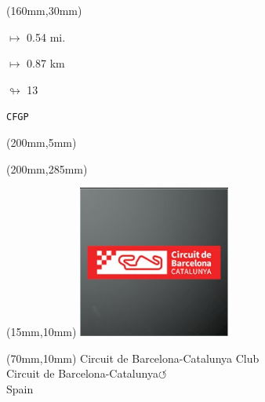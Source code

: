 \begin{textblock*}{40mm}(160mm,30mm)%
\Large
\par$\mapsto$ 0.54 mi.
\par$\mapsto$ 0.87 km
\par$\looparrowright$ 13
\par\hfill\tiny\tt CFGP\\
\end{textblock*}
\begin{textblock*}{20mm}(200mm,5mm)%
\fbox{\thepage}
\label{CFGP}
\end{textblock*}
\begin{textblock*}{20mm}(200mm,285mm)%
\fbox{\thepage}
\end{textblock*}

\null\newpage
\begin{textblock*}{50mm}(15mm,10mm)%
\includegraphics[width=50mm]{LG/2015-05-20_00078.png}
\end{textblock*}
\begin{textblock*}{130mm}(70mm,10mm)%
{\fontsize{20}{20}\selectfont Circuit de Barcelona-Catalunya Club\\}
{\fontsize{16}{16}\selectfont Circuit de Barcelona-Catalunya\hfill \huge$\circlearrowleft$\\}
{\fontsize{12}{12}\selectfont Spain\\}
\end{textblock*}

